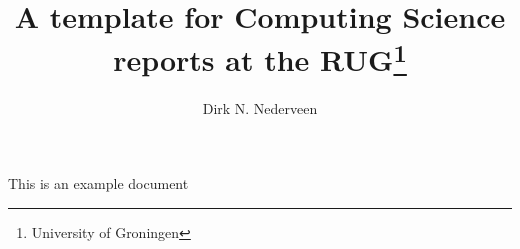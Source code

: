 \documentclass[11pt]{RUGreport}
\author{Dirk N. Nederveen}
\title{A template for Computing Science reports at the RUG\footnote{University of Groningen}}
\date{}
\begin{document}
This is an example document
\end{document}
